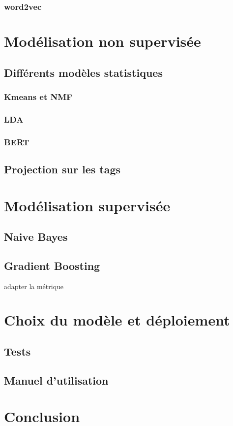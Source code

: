 \documentclass{article}
\begin{document}
\subsubsection*{word2vec}


\section{Modélisation non supervisée}
\subsection{Différents modèles statistiques}
\subsubsection*{Kmeans et NMF}
\subsubsection*{LDA}

\subsubsection*{BERT}
\subsection{Projection sur les tags}


\section{Modélisation supervisée}
\subsection{Naive Bayes}
\subsection{Gradient Boosting }
adapter la métrique

\section{Choix du modèle et déploiement}
\subsection{Tests}
\subsection{Manuel d'utilisation}

\section*{Conclusion}
\end{document}
